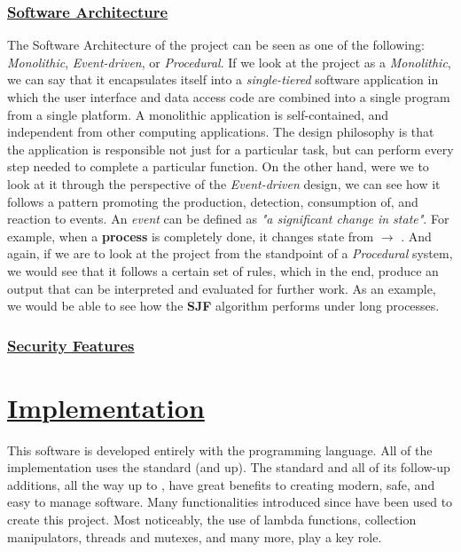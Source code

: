 \documentclass{article}
\newcommand{\code}[1]{\codeinline{\texttt{#1}}}
\begin{document}
\subsubsection{\underline{Software Architecture}}

The Software Architecture of the project can be seen as one of the following: \textit{Monolithic}, \textit{Event-driven}, or \textit{Procedural}. If we look at the project as a \textit{Monolithic}, we can say that it encapsulates itself into a \textit{single-tiered} software application in which the user interface and data access code are combined into a single program from a single platform. A monolithic application is self-contained, and independent from other computing applications. The design philosophy is that the application is responsible not just for a particular task, but can perform every step needed to complete a particular function. On the other hand, were we to look at it through the perspective of the \textit{Event-driven} design, we can see how it follows a pattern promoting the production, detection, consumption of, and reaction to events. An \textit{event} can be defined as \textit{"a significant change in state"}. For example, when a \textbf{process} \code{ttl} is completely done, it changes state from \code{RUNNING} $\rightarrow$ \code{DONE}. And again, if we are to look at the project from the standpoint of a \textit{Procedural} system, we would see that it follows a certain set of rules, which in the end, produce an output that can be interpreted and evaluated for further work. As an example, we would be able to see how the \textbf{SJF} algorithm performs under long processes.

\subsubsection{\underline{Security Features}}

\section{\underline{Implementation}}

This software is developed entirely with the \code{C++} programming language. All of the implementation uses the \code{C++ 11} standard (and up). The \code{C++ 11} standard and all of its follow-up additions, all the way up to \code{C++ 20}, have great benefits to creating modern, safe, and easy to manage software. Many functionalities introduced since \code{C++ 11} have been used to create this project. Most noticeably, the use of lambda functions, collection manipulators, threads and mutexes, and many more, play a key role.
\end{document}
